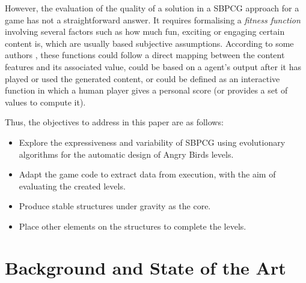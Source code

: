 \documentclass[runningheads,a4paper]{llncs}
\begin{document}
However, the evaluation of the quality of a solution in a SBPCG approach for a game has not a straightforward answer. It requires formalising a \textit{fitness function} involving several factors such as how much fun, exciting or engaging certain content is, which are usually based subjective assumptions.
According to some authors \cite{togelius2010search}, these functions could follow a direct mapping between the content features and its associated value, could be based on a agent's output after it has played or used the generated content, or could be defined as an interactive function in which a human player gives a personal score (or provides a set of values to compute it).


Thus, the objectives to address in this paper are as follows:
\begin{itemize}
	\item Explore the expressiveness and variability of SBPCG using evolutionary algorithms for the automatic design of Angry Birds levels.
	\item Adapt the game code to extract data from execution, with the aim of evaluating the created levels.
	\item Produce stable structures under gravity as the core.
	\item Place other elements on the structures to complete the levels.
\end{itemize}




\section{Background and State of the Art}
\label{sec:soa}

\end{document}
